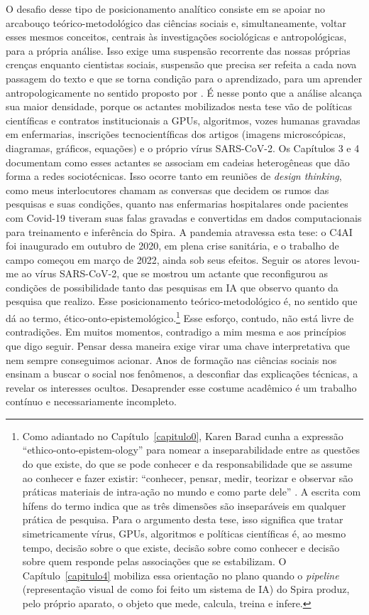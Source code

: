 O desafio desse tipo de posicionamento analítico consiste em se apoiar no arcabouço teórico-metodológico das ciências sociais e, simultaneamente, voltar esses mesmos conceitos, centrais às investigações sociológicas e antropológicas, para a própria análise. Isso exige uma suspensão recorrente das nossas próprias crenças enquanto cientistas sociais, suspensão que precisa ser refeita a cada nova passagem do texto e que se torna condição para o aprendizado, para um aprender antropologicamente no sentido proposto por \textcite{Ingold2019Antropologia}. É nesse ponto que a análise alcança sua maior densidade, porque os actantes mobilizados nesta tese vão de políticas científicas e contratos institucionais a GPUs, algoritmos, vozes humanas gravadas em enfermarias, inscrições tecnocientíficas dos artigos (imagens microscópicas, diagramas, gráficos, equações) e o próprio vírus SARS-CoV-2. Os Capítulos 3 e 4 documentam como esses actantes se associam em cadeias heterogêneas que dão forma a redes sociotécnicas. Isso ocorre tanto em reuniões de \textit{design thinking}, como meus interlocutores chamam as conversas que decidem os rumos das pesquisas e suas condições, quanto nas enfermarias hospitalares onde pacientes com Covid-19 tiveram suas falas gravadas e convertidas em dados computacionais para treinamento e inferência do Spira. A pandemia atravessa esta tese: o C4AI foi inaugurado em outubro de 2020, em plena crise sanitária, e o trabalho de campo começou em março de 2022, ainda sob seus efeitos. Seguir os atores levou-me ao vírus SARS-CoV-2, que se mostrou um actante que reconfigurou as condições de possibilidade tanto das pesquisas em IA que observo quanto da pesquisa que realizo. Esse posicionamento teórico-metodológico é, no sentido que \textcite{Barad2007Meeting} dá ao termo, ético-onto-epistemológico.\footnote{Como adiantado no Capítulo~\ref{capitulo0}, Karen Barad cunha a expressão \enquote{ethico-onto-epistem-ology} para nomear a inseparabilidade entre as questões do que existe, do que se pode conhecer e da responsabilidade que se assume ao conhecer e fazer existir: \enquote{conhecer, pensar, medir, teorizar e observar são práticas materiais de intra-ação no mundo e como parte dele} \parencite[p.~90]{Barad2007Meeting}. A escrita com hífens do termo indica que as três dimensões são inseparáveis em qualquer prática de pesquisa. Para o argumento desta tese, isso significa que tratar simetricamente vírus, GPUs, algoritmos e políticas científicas é, ao mesmo tempo, decisão sobre o que existe, decisão sobre como conhecer e decisão sobre quem responde pelas associações que se estabilizam. O Capítulo~\ref{capitulo4} mobiliza essa orientação no plano quando o \textit{pipeline} (representação visual de como foi feito um sistema de IA) do Spira produz, pelo próprio aparato, o objeto que mede, calcula, treina e infere.} Esse esforço, contudo, não está livre de contradições. Em muitos momentos, contradigo a mim mesma e aos princípios que digo seguir. Pensar dessa maneira exige virar uma chave interpretativa que nem sempre conseguimos acionar. Anos de formação nas ciências sociais nos ensinam a buscar o social nos fenômenos, a desconfiar das explicações técnicas, a revelar os interesses ocultos. Desaprender esse costume acadêmico é um trabalho contínuo e necessariamente incompleto. 